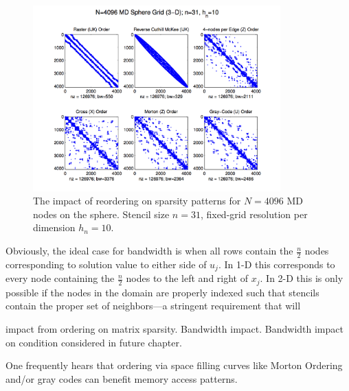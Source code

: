 \documentclass{report}
\begin{document}
\begin{figure}
\centering
\includegraphics[width=0.85\textwidth]{rbffd_methods_content/hashing/dm_node_orderings_md4096_n31_hn10.png} 
\caption{ The impact of reordering on sparsity patterns for $N=4096$ MD nodes on the sphere. Stencil size $n=31$, fixed-grid resolution per dimension $h_n=10$. }
\label{fig:orderings}
\end{figure}




Obviously, the ideal case for bandwidth is when all rows contain the $\frac{n}{2}$ nodes corresponding to solution value to either side of $u_j$. In 1-D this corresponds to every node containing the $\frac{n}{2}$ nodes to the left and right of $x_j$. In 2-D this is only possible if the nodes in the domain are properly indexed such that stencils contain the proper set of neighbors---a stringent requirement that will 

impact from ordering on matrix sparsity. Bandwidth impact. Bandwidth impact on condition considered in future chapter. 

One frequently hears that ordering via space filling curves like Morton Ordering and/or gray codes can benefit memory access patterns. 


\end{document}
